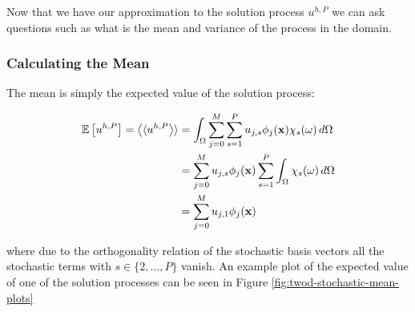 Now that we have our approximation to the solution process $u^{h,P}$ we can ask
questions such as what is the mean and variance of the process in the domain.

\subsubsection{Calculating the Mean}

The mean is simply the expected value of the solution process:

\begin{align}
  \begin{split}
    \mathbb{E}\left[u^{h,P}\right] = \left\langle\langle u^{h,P}\right\rangle\rangle
      &= \int_\Omega\sum_{j=0}^M\sum_{s=1}^Pu_{j,s}\phi_j(\mathbf{x})\chi_s(\omega)\, d\Omega \\
      &= \sum_{j=0}^Mu_{j,s}\phi_j(\mathbf{x})\sum_{s=1}^P\int_\Omega\chi_s(\omega)\, d\Omega \\
      &= \sum_{j=0}^Mu_{j,1}\phi_j(\mathbf{x})
  \end{split}
\end{align}

where due to the orthogonality relation of the stochastic basis vectors all the
stochastic terms with $s \in \{2, \ldots, P\}$ vanish. An example plot of the
expected value of one of the solution processes can be seen in Figure
\ref{fig:twod-stochastic-mean-plots}


